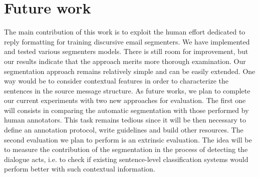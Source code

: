 

\section{Future work}
\label{sec:futureWork}

The main contribution of this work is to exploit the human effort dedicated to reply formatting for training discursive email segmenters. 
We have implemented and tested various segmenters models. 
There is still room for improvement, but our results indicate that the approach merits more thorough examination.
%
Our segmentation approach remains relatively simple and can be easily extended. One way would be to consider contextual features in order to characterize the sentences in the source message structure.
%
As future works, we plan to complete our current experiments with two new approaches for evaluation. The first one will consists in comparing the automatic segmentation with those performed by human annotators.
This task remains tedious since it will be then necessary to define an annotation protocol, write guidelines and build other resources.
The second evaluation we plan to perform is an extrinsic evaluation. The idea will be to measure the contribution of the segmentation in the process of detecting the dialogue acts, i.e. to check if existing sentence-level classification systems would perform better with such contextual information. %

